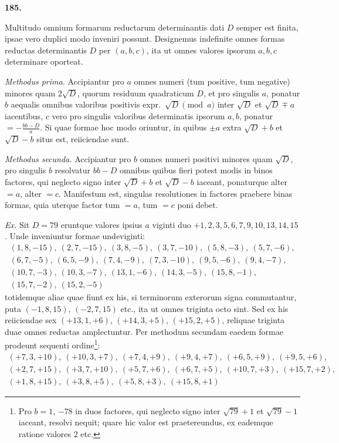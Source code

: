 \documentclass[12pt,a4paper]{article}
\theoremstyle{plain}
\theoremstyle{definition}
\theoremstyle{remark}
\begin{document}
\textbf{185.}

Multitudo omnium formarum reductarum determinantis dati $D$ semper est finita, ipsae vero duplici modo inveniri possunt. Designemus indefinite omnes formas reductas determinantis $D$ per $(a,b,c)$, ita ut omnes valores ipsorum $a,b,c$ determinare oporteat.

\textit{Methodus prima.} Accipiantur pro $a$ omnes numeri (tum positive, tum negative) minores quam $2\sqrt{D}$, quorum residuum quadraticum $D$, et pro singulis $a$, ponatur $b$ aequalis omnibus valoribus positivis expr.\ $\sqrt{D}\pmod{a}$ inter $\sqrt{D}$ et $\sqrt{D}\mp a$ iacentibus, $c$ vero pro singulis valoribus determinatis ipsorum $a,b$, ponatur $=-\frac{bb-D}{a}$. Si quae formae hoc modo oriuntur, in quibus $\pm a$ extra $\sqrt{D}+b$ et $\sqrt{D}-b$ situs est, reiiciendae sunt.

\textit{Methodus secunda.} Accipiantur pro $b$ omnes numeri positivi minores quam $\sqrt{D}$, pro singulis $b$ resolvatur $bb-D$ omnibus quibus fieri potest modis in binos factores, qui neglecto signo inter $\sqrt{D}+b$ et $\sqrt{D}-b$ iaceant, ponaturque alter $=a$, alter $=c$. Manifestum est, singulas resolutiones in factores praebere binas formas, quia uterque factor tum $=a$, tum $=c$ poni debet.

\textit{Ex.} Sit $D=79$ eruntque valores ipsius $a$ viginti duo $+1,2,3,5,6,7,9,10,13,14,15$. Unde inveniuntur formae undeviginti:
\begin{gather*}
(1,8,-15),\ (2,7,-15),\ (3,8,-5),\ (3,7,-10),\ (5,8,-3),\ (5,7,-6),\\
(6,7,-5),\ (6,5,-9),\ (7,4,-9),\ (7,3,-10),\ (9,5,-6),\ (9,4,-7),\\
(10,7,-3),\ (10,3,-7),\ (13,1,-6),\ (14,3,-5),\ (15,8,-1),\\
(15,7,-2),\ (15,2,-5)
\end{gather*}
totidemque aliae quae fiunt ex his, si terminorum exterorum signa commutantur, puta $(-1,8,15)$, $(-2,7,15)$ etc., ita ut omnes triginta octo sint. Sed ex his reiiciendae sex $(+13,1,+6)$, $(+14,3,+5)$, $(+15,2,+5)$, reliquae triginta duae omnes reductas amplectuntur. Per methodum secundam eaedem formae prodeunt sequenti ordine\footnote{Pro $b=1$, $-78$ in duos factores, qui neglecto signo inter $\sqrt{79}+1$ et $\sqrt{79}-1$ iaceant, resolvi nequit; quare hic valor est praetereundus, ex eademque ratione valores $2$ etc.}:
\begin{gather*}
(+7,3,+10),\ (+10,3,+7),\ (+7,4,+9),\ (+9,4,+7),\ (+6,5,+9),\ (+9,5,+6),\\
(+2,7,+15),\ (+3,7,+10),\ (+5,7,+6),\ (+6,7,+5),\ (+10,7,+3),\ (+15,7,+2),\\
(+1,8,+15),\ (+3,8,+5),\ (+5,8,+3),\ (+15,8,+1)
\end{gather*}
\end{document}
